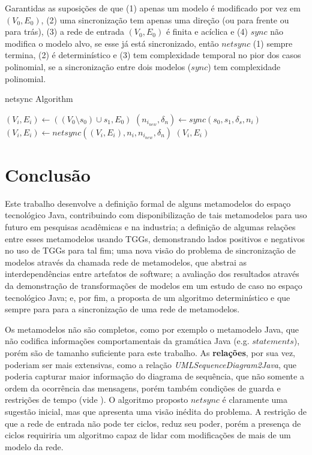 \documentclass[cic,resumo-unibral]{iiufrgs}
\begin{document}
\begin{extendedsummary}
Garantidas as suposições de que (1) apenas um modelo é modificado por vez em $(V_0,E_0)$, (2) uma sincronização tem apenas uma direção (ou para frente ou para trás), (3) a rede de entrada $(V_0,E_0)$ é finita e acíclica e (4) $sync$ não modifica o modelo alvo, se esse já está sincronizado, então $netsync$ (1) sempre termina, (2) é determinístico e (3) tem complexidade temporal no pior dos casos polinomial, se a sincronização entre dois modelos ($sync$) tem complexidade polinomial.

\begin{algorithm}[H]
	\caption{netsync Algorithm}
	\begin{algorithmic}[1]
		\State $(V_i,E_i) \leftarrow ((V_0 \setminus s_0) \cup s_1, E_0)$ 
			\State $(n_{i_{new}}, \delta_n) \leftarrow sync(s_0, s_1, \delta_s, n_i)$ 
			 
				\State $(V_i,E_i) \leftarrow netsync((V_i,E_i), n_i, n_{i_{new}}, \delta_n)$ 
			\EndIf
		\EndFor
		\State \Return $(V_i, E_i)$
		\EndFunction
	\end{algorithmic}
\end{algorithm}

\section{Conclusão}
Este trabalho desenvolve a definição formal de alguns metamodelos do espaço tecnológico Java, contribuindo com disponibilização de tais metamodelos para uso futuro em pesquisas acadêmicas e na industria; a definição de algumas relações entre esses metamodelos usando TGGs, demonstrando lados positivos e negativos no uso de TGGs para tal fim; uma nova visão do problema de sincronização de modelos através da chamada rede de metamodelos, que abstrai as interdependências entre artefatos de software; a avaliação dos resultados através da demonstração de transformações de modelos em um estudo de caso no espaço tecnológico Java; e, por fim, a proposta de um algoritmo determinístico e que sempre para para a sincronização de uma rede de metamodelos.

Os metamodelos não são completos, como por exemplo o metamodelo Java, que não codifica informações comportamentais da gramática Java (e.g. $statements$), porém são de tamanho suficiente para este trabalho. As \textbf{relações}, por sua vez, poderiam ser mais extensivas, como a relação \textit{UMLSequenceDiagram2Java}, que poderia capturar maior informação do diagrama de sequência, que não somente a ordem da ocorrência das mensagens, porém também condições de guarda e restrições de tempo (vide \citet{omg2007unified}). O algoritmo proposto $netsync$ é claramente uma sugestão inicial, mas que apresenta uma visão inédita do problema. A restrição de que a rede de entrada não pode ter ciclos, reduz seu poder, porém a presença de ciclos requiriria um algoritmo capaz de lidar com modificações de mais de um modelo da rede.
 

\end{extendedsummary}
\end{document}
